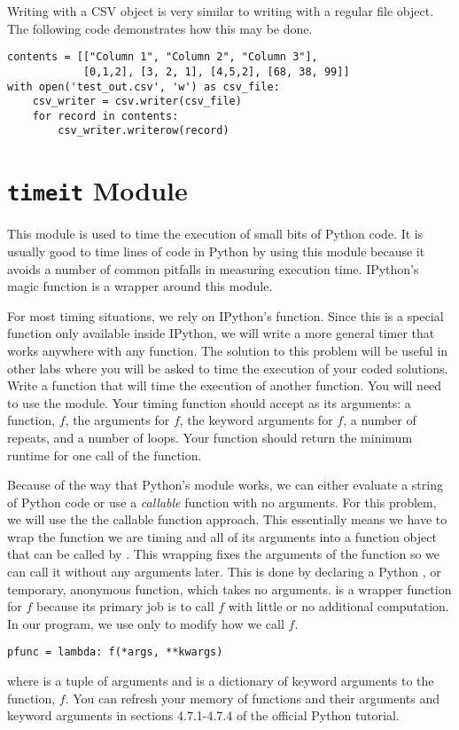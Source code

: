 Writing with a CSV  object is very similar to writing with a regular file object.
The following code demonstrates how this may be done.
\begin{lstlisting}
contents = [["Column 1", "Column 2", "Column 3"],
            [0,1,2], [3, 2, 1], [4,5,2], [68, 38, 99]]
with open('test_out.csv', 'w') as csv_file:
    csv_writer = csv.writer(csv_file)
    for record in contents:
        csv_writer.writerow(record)
\end{lstlisting}

\section*{\texttt{timeit} Module}
This module is used to time the execution of small bits of Python code.
It is usually good to time lines of code in Python by using this module because it avoids a number of common pitfalls in measuring execution time.
IPython's  magic function is a wrapper around this module.

\begin{problem}
For most timing situations, we rely on IPython's  function.
Since this is a special function only available inside IPython, we will write a more general timer that works anywhere with any function.
The solution to this problem will be useful in other labs where you will be asked to time the execution of your coded solutions.
Write a function that will time the execution of another function.
You will need to use the  module.
Your timing function should accept as its arguments: a function, $f$, the arguments for $f$, the keyword arguments for $f$, a number of repeats, and a number of loops.
Your function should return the minimum runtime for one call of the function.

Because of the way that Python's  module works, we can either evaluate a string of Python code or use a \emph{callable} function with no arguments.  
For this problem, we will use the the callable function approach.
This essentially means we have to wrap the function we are timing and all of its arguments into a function object that can be called by .
This wrapping fixes the arguments of the function so we can call it without any arguments later.
This is done by declaring a Python , or temporary, anonymous  function, which takes no arguments.   is a wrapper function for $f$ because its primary job is to call $f$ with little or no additional computation.
In our program, we use  only to modify how we call $f$.
\begin{lstlisting}
pfunc = lambda: f(*args, **kwargs)
\end{lstlisting}
where  is a tuple of arguments and  is a dictionary of keyword arguments to the function, $f$.
You can refresh your memory of functions and their arguments and keyword arguments in sections 4.7.1-4.7.4 of the official Python tutorial.
\end{problem}

